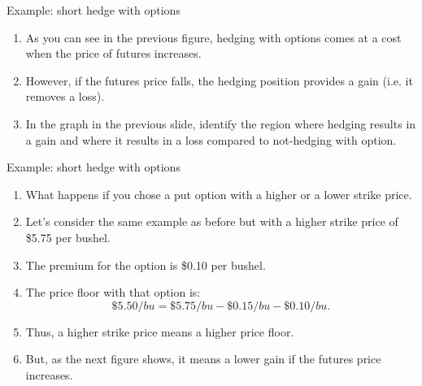 \documentclass[table,xcolor=pdftex,dvipsnames, handout]{beamer}\usepackage[]{graphicx}\usepackage[]{color}
\begin{document}

\begin{frame}{Example: short hedge with options}
\begin{enumerate}[label=\textbullet]
  \item As you can see in the previous figure, hedging with options comes at a cost when the price of futures increases.
  \item However, if the futures price falls, the hedging position provides a gain (i.e. it removes a loss).
  \item \textcolor[rgb]{0.00,0.00,1.00}{In the graph in the previous slide, identify the region where hedging results in a gain and where it results in a loss compared to not-hedging with option.}
\end{enumerate}
\end{frame}


\begin{frame}{Example: short hedge with options}
\begin{enumerate}[label=\textbullet]
  \item What happens if you chose a put option with a higher or a lower strike price.
  \item Let's consider the same example as before but with a higher strike price of \$5.75 per bushel.
  \item The premium for the option is \$0.10 per bushel.
  \item The price floor with that option is: \[\$5.50/bu = \$5.75/bu - \$0.15/bu - \$0.10/bu.\]
    \vspace{-\baselineskip}
  \item Thus, a higher strike price means a higher price floor.
  \item But, as the next figure shows, it means a lower gain if the futures price increases.
\end{enumerate}
\end{frame}

\end{document}
